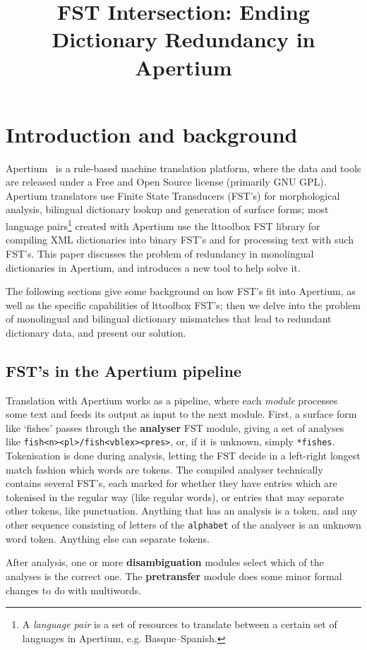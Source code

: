\documentclass[10pt, a4paper]{article}
\title{FST Intersection: Ending Dictionary Redundancy in Apertium} %
\newcommand{\ana}[1]{\texttt{#1}}
\newcommand{\f}[1]{`#1'}
\begin{document}
\maketitleabstract

\section{Introduction and background}

Apertium~\cite{forcada2011afp} is a rule-based machine translation
platform, where the data and tools are released under a Free and Open
Source license (primarily GNU GPL). Apertium translators use Finite
State Transducers (FST's) for morphological analysis, bilingual
dictionary lookup and generation of surface forms; most language
pairs\footnote{A \emph{language pair} is a set of resources to
    translate between a certain set of languages in Apertium, e.g.
Basque--Spanish.} created with Apertium use the lttoolbox FST
library for compiling XML dictionaries into binary FST's and for
processing text with such FST's. This paper discusses the problem of
redundancy in monolingual dictionaries in Apertium, and introduces a
new tool to help solve it.

The following sections give some background on how FST's fit into
Apertium, as well as the specific capabilities of lttoolbox
FST's; then we delve into the problem of monolingual and bilingual
dictionary mismatches that lead to redundant dictionary data, and
present our solution.

\subsection{FST's in the Apertium pipeline}
\label{sec:pipeline}

Translation with Apertium works as a pipeline, where each
\emph{module} processes some text and feeds its output as input to the
next module. First, a surface form like \f{fishes} passes through the
\textbf{analyser} FST module, giving a set of analyses like
\ana{fish<n><pl>/fish<vblex><pres>}, or, if it is unknown, simply
\ana{*fishes}. Tokenisation is done during analysis, letting the FST
decide in a left-right longest match fashion which words are tokens.
The compiled analyser technically contains several FST's, each marked
for whether they have entries which are tokenised in the regular
way (like regular words), or entries that may separate other tokens,
like punctuation. Anything that has an analysis is a token, and any
other sequence consisting of letters of the \texttt{alphabet} of the
analyser is an unknown word token. Anything else can separate tokens.

After analysis, one or more \textbf{disambiguation} modules select
which of the analyses is the correct one. The \textbf{pretransfer}
module does some minor formal changes to do with multiwords.
\end{document}
